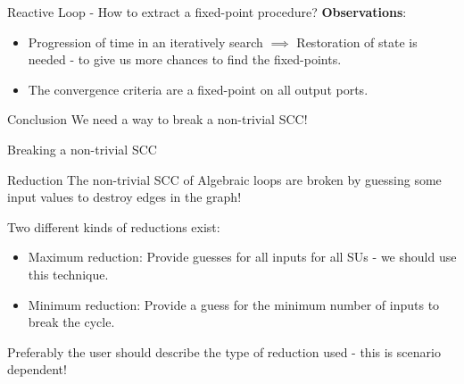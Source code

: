 \documentclass{beamer}
\begin{document}
\begin{frame}{Reactive Loop - How to extract a fixed-point procedure?}
    \textbf{Observations}: 
    \begin{itemize}
        \item Progression of time in an iteratively search $\implies$ Restoration of state is needed - to give us more chances to find the fixed-points. 
        \item The convergence criteria are a fixed-point on all output ports.
    \end{itemize}
    \begin{block}{Conclusion}
        We need a way to break a non-trivial SCC!        
    \end{block}
\end{frame}

\begin{frame}{Breaking a non-trivial SCC}
    \begin{block}{Reduction}
        The non-trivial SCC of Algebraic loops are broken by guessing some input values to destroy edges in the graph!

    \end{block}
    Two different kinds of reductions exist:
    \begin{itemize}
        \item Maximum reduction: Provide guesses for all inputs for all SUs - we should use this technique. 
        \item Minimum reduction: Provide a guess for the minimum number of inputs to break the cycle.
    \end{itemize}
    Preferably the user should describe the type of reduction used - this is scenario dependent!
\end{frame}
\end{document}
